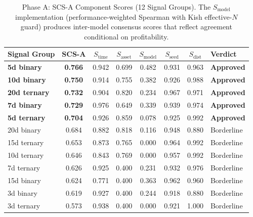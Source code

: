 \documentclass[12pt,a4paper]{article}
\begin{document}
\begin{table}[H]
\centering
\caption{Phase A: SCS-A Component Scores (12 Signal Groups). The $S_{\text{model}}$ implementation (performance-weighted Spearman with Kish effective-$N$ guard) produces inter-model consensus scores that reflect agreement conditional on profitability.}
\label{tab:phase_a}
\begin{tabular}{lccccccl}
\toprule
Signal Group & SCS-A & $S_{\text{time}}$ & $S_{\text{asset}}$ & $S_{\text{model}}$ & $S_{\text{seed}}$ & $S_{\text{dist}}$ & Verdict \\
\midrule
\textbf{5d binary}   & \textbf{0.766} & 0.942 & 0.699 & 0.482 & 0.931 & 0.963 & \textbf{Approved} \\
\textbf{10d binary}  & \textbf{0.750} & 0.914 & 0.755 & 0.382 & 0.926 & 0.988 & \textbf{Approved} \\
\textbf{20d ternary} & \textbf{0.732} & 0.904 & 0.820 & 0.234 & 0.967 & 0.971 & \textbf{Approved} \\
\textbf{7d binary}   & \textbf{0.729} & 0.976 & 0.649 & 0.339 & 0.939 & 0.974 & \textbf{Approved} \\
\textbf{5d ternary}  & \textbf{0.704} & 0.926 & 0.859 & 0.078 & 0.925 & 0.992 & \textbf{Approved} \\
20d binary  & 0.684 & 0.882 & 0.818 & 0.116 & 0.948 & 0.880 & Borderline \\
15d ternary & 0.653 & 0.873 & 0.765 & 0.000 & 0.964 & 0.992 & Borderline \\
10d ternary & 0.646 & 0.843 & 0.769 & 0.000 & 0.957 & 0.992 & Borderline \\
7d ternary  & 0.626 & 0.925 & 0.400 & 0.231 & 0.932 & 0.976 & Borderline \\
15d binary  & 0.624 & 0.771 & 0.400 & 0.363 & 0.962 & 0.960 & Borderline \\
3d binary   & 0.619 & 0.927 & 0.400 & 0.244 & 0.918 & 0.880 & Borderline \\
3d ternary  & 0.573 & 0.938 & 0.400 & 0.000 & 0.921 & 1.000 & Borderline \\
\bottomrule
\end{tabular}
\end{table}
\end{document}
